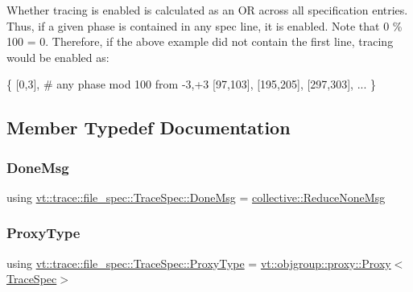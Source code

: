 Whether tracing is enabled is calculated as an OR across all specification entries. Thus, if a given phase is contained in any spec line, it is enabled. Note that 0 \% 100 = 0. Therefore, if the above example did not contain the first line, tracing would be enabled as\+:

\{ \mbox{[}0,3\mbox{]}, \# any phase mod 100 from -\/3,+3 \mbox{[}97,103\mbox{]}, \mbox{[}195,205\mbox{]}, \mbox{[}297,303\mbox{]}, ... \} 

\subsection{Member Typedef Documentation}
\mbox{\label{structvt_1_1trace_1_1file__spec_1_1_trace_spec_a31fc42c00ddc382be9c198459793e1e9}} 
\subsubsection{\texorpdfstring{Done\+Msg}{DoneMsg}}
{\footnotesize\ttfamily using \hyperlink{structvt_1_1trace_1_1file__spec_1_1_trace_spec_a31fc42c00ddc382be9c198459793e1e9}{vt\+::trace\+::file\+\_\+spec\+::\+Trace\+Spec\+::\+Done\+Msg} =  \hyperlink{namespacevt_1_1collective_aa439a90f05078f2bcf918641c951946f}{collective\+::\+Reduce\+None\+Msg}}

\mbox{\label{structvt_1_1trace_1_1file__spec_1_1_trace_spec_a26160cff9bb5115866943ed823405f1f}} 
\subsubsection{\texorpdfstring{Proxy\+Type}{ProxyType}}
{\footnotesize\ttfamily using \hyperlink{structvt_1_1trace_1_1file__spec_1_1_trace_spec_a26160cff9bb5115866943ed823405f1f}{vt\+::trace\+::file\+\_\+spec\+::\+Trace\+Spec\+::\+Proxy\+Type} =  \hyperlink{structvt_1_1objgroup_1_1proxy_1_1_proxy}{vt\+::objgroup\+::proxy\+::\+Proxy}$<$\hyperlink{structvt_1_1trace_1_1file__spec_1_1_trace_spec}{Trace\+Spec}$>$}

